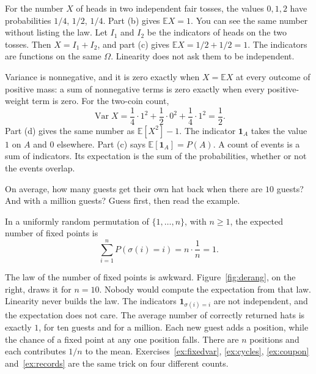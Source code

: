 For the number $X$ of heads in two independent fair tosses, the values $0,1,2$ have probabilities $1/4$, $1/2$, $1/4$. Part (b) gives $\mathbb EX=1$. You can see the same number without listing the law. Let $I_1$ and $I_2$ be the indicators of heads on the two tosses. Then $X=I_1+I_2$, and part (c) gives $\mathbb EX=1/2+1/2=1$. The indicators are functions on the same $\Omega$. Linearity does not ask them to be independent.

Variance is nonnegative, and it is zero exactly when $X=\mathbb EX$ at every outcome of positive mass: a sum of nonnegative terms is zero exactly when every positive-weight term is zero. For the two-coin count,
\[
 \operatorname{Var}X=\frac14\cdot1^2+\frac12\cdot0^2+\frac14\cdot1^2=\frac12.
\]
Part (d) gives the same number as $\mathbb E[X^2]-1$. The indicator $\mathbf1_A$ takes the value $1$ on $A$ and $0$ elsewhere. Part (c) says $\mathbb E[\mathbf1_A]=P(A)$. A count of events is a sum of indicators. Its expectation is the sum of the probabilities, whether or not the events overlap.

\begin{think}
On average, how many guests get their own hat back when there are $10$ guests? And with a million guests? Guess first, then read the example.
\end{think}

\begin{example}
In a uniformly random permutation of $\{1,\ldots,n\}$, with $n\ge1$, the expected number of fixed points is
\[
 \sum_{i=1}^n P(\sigma(i)=i)=n\cdot\frac1n=1.
\]
\end{example}

The law of the number of fixed points is awkward. Figure~\ref{fig:derang}, on the right, draws it for $n=10$. Nobody would compute the expectation from that law. Linearity never builds the law. The indicators $\mathbf1_{\sigma(i)=i}$ are not independent, and the expectation does not care. The average number of correctly returned hats is exactly $1$, for ten guests and for a million. Each new guest adds a position, while the chance of a fixed point at any one position falls. There are $n$ positions and each contributes $1/n$ to the mean. Exercises~\ref{ex:fixedvar}, \ref{ex:cycles}, \ref{ex:coupon} and~\ref{ex:records} are the same trick on four different counts.

